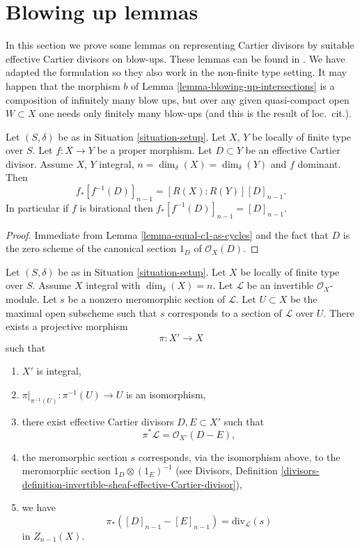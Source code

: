 \section{Blowing up lemmas}
\label{section-blowing-up-lemmas}

\noindent
In this section we prove some lemmas on representing
Cartier divisors by suitable effective Cartier divisors
on blow-ups. These lemmas can be found in \cite[Section 2.4]{F}.
We have adapted the formulation so they also work
in the non-finite type setting. It may happen that the morphism $b$
of Lemma \ref{lemma-blowing-up-intersections} is a composition of
infinitely many blow ups, but over any given quasi-compact open
$W \subset X$ one needs only finitely many blow-ups
(and this is the result of loc.\ cit.).

\begin{lemma}
\label{lemma-push-pull-effective-Cartier}
Let $(S, \delta)$ be as in Situation \ref{situation-setup}.
Let $X$, $Y$ be locally of finite type over $S$.
Let $f : X \to Y$ be a proper morphism.
Let $D \subset Y$ be an effective Cartier divisor.
Assume $X$, $Y$ integral, $n = \dim_\delta(X) = \dim_\delta(Y)$ and
$f$ dominant. Then
$$
f_*[f^{-1}(D)]_{n - 1} = [R(X) : R(Y)] [D]_{n - 1}.
$$
In particular if $f$ is birational then $f_*[f^{-1}(D)]_{n - 1} = [D]_{n - 1}$.
\end{lemma}

\begin{proof}
Immediate from Lemma \ref{lemma-equal-c1-as-cycles}
and the fact that $D$ is the zero
scheme of the canonical section $1_D$ of $\mathcal{O}_X(D)$.
\end{proof}

\begin{lemma}
\label{lemma-blowing-up-denominators}
Let $(S, \delta)$ be as in Situation \ref{situation-setup}.
Let $X$ be locally of finite type over $S$.
Assume $X$ integral with $\dim_\delta(X) = n$.
Let $\mathcal{L}$ be an invertible $\mathcal{O}_X$-module.
Let $s$ be a nonzero meromorphic section of $\mathcal{L}$.
Let $U \subset X$ be the maximal open subscheme such that
$s$ corresponds to a section of $\mathcal{L}$ over $U$.
There exists a projective morphism
$$
\pi : X' \longrightarrow X
$$
such that
\begin{enumerate}
\item $X'$ is integral,
\item $\pi|_{\pi^{-1}(U)} : \pi^{-1}(U) \to U$ is an isomorphism,
\item there exist effective Cartier divisors $D, E \subset X'$
such that
$$
\pi^*\mathcal{L} = \mathcal{O}_{X'}(D - E),
$$
\item the meromorphic section $s$ corresponds, via the isomorphism above,
to the meromorphic section $1_D \otimes (1_E)^{-1}$ (see
Divisors, Definition
\ref{divisors-definition-invertible-sheaf-effective-Cartier-divisor}),
\item we have
$$
\pi_*([D]_{n - 1} - [E]_{n - 1}) = \text{div}_\mathcal{L}(s)
$$
in $Z_{n - 1}(X)$.
\end{enumerate}
\end{lemma}

